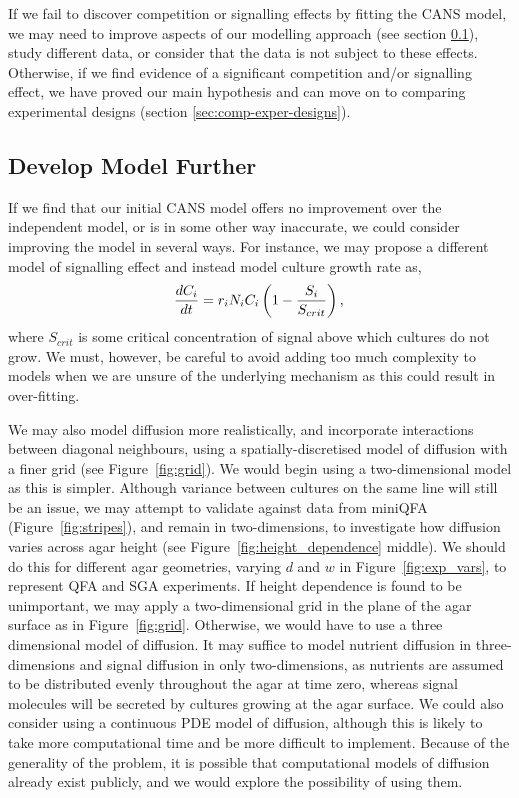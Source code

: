 If we fail to discover competition or signalling effects by fitting
the CANS model, we may need to improve aspects of our modelling
approach (see section \ref{sec:dev-mod-further}), study different
data, or consider that the data is not subject to these
effects. Otherwise, if we find evidence of a significant competition
and/or signalling effect, we have proved our main hypothesis and can
move on to comparing experimental designs (section
\ref{sec:comp-exper-designs}).

\subsection{Develop Model Further}
\label{sec:dev-mod-further}
If we find that our initial CANS model offers no improvement over the
independent model, or is in some other way inaccurate, we could
consider improving the model in several ways. For instance, we may
propose a different model of signalling effect and instead model
culture growth rate as,
\begin{equation}
  \label{eq:7}
  \frac{dC_{i}}{dt} = r_{i}N_{i}C_{i}\left(1 - \frac{S_{i}}{S_{crit}}\right),\\
\end{equation}
where \(S_{crit}\) is some critical concentration of signal above
which cultures do not grow. We must, however, be careful to avoid
adding too much complexity to models when we are unsure of the
underlying mechanism as this could result in over-fitting.

We may also model diffusion more realistically, and incorporate
interactions between diagonal neighbours, using a
spatially-discretised model of diffusion with a finer grid (see
Figure~\ref{fig:grid}). We would begin using a two-dimensional model
as this is simpler. Although variance between cultures on the same
line will still be an issue, we may attempt to validate against data
from miniQFA (Figure~\ref{fig:stripes}), and remain in two-dimensions,
to investigate how diffusion varies across agar height (see
Figure~\ref{fig:height_dependence} middle). We should do this for
different agar geometries, varying \(d\) and \(w\) in
Figure~\ref{fig:exp_vars}, to represent QFA and SGA experiments. If
height dependence is found to be unimportant, we may apply a
two-dimensional grid in the plane of the agar surface as in
Figure~\ref{fig:grid}. Otherwise, we would have to use a three
dimensional model of diffusion. It may suffice to model nutrient
diffusion in three-dimensions and signal diffusion in only
two-dimensions, as nutrients are assumed to be distributed evenly
throughout the agar at time zero, whereas signal molecules will be
secreted by cultures growing at the agar surface. We could also
consider using a continuous PDE model of diffusion, although this is
likely to take more computational time and be more difficult to
implement. Because of the generality of the problem, it is possible
that computational models of diffusion already exist publicly, and we
would explore the possibility of using them.


